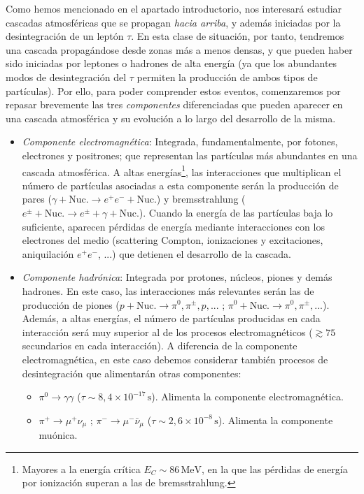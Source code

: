 \documentclass[12 pt, a4paper]{article} %
\numberwithin{equation}{section}
\numberwithin{figure}{section}
\numberwithin{table}{section}
\begin{document}
Como hemos mencionado en el apartado introductorio, nos interesará estudiar cascadas atmosféricas que se propagan \textit{hacia arriba}, y además iniciadas por la desintegración de un leptón $\tau$. En esta clase de situación, por tanto, tendremos una cascada propagándose desde zonas más a menos densas, y que pueden haber sido iniciadas por leptones o hadrones de alta energía (ya que los abundantes modos de desintegración del $\tau$ permiten la producción de ambos tipos de partículas). Por ello, para poder comprender estos eventos, comenzaremos por repasar brevemente las tres \textit{componentes} diferenciadas que pueden aparecer en una cascada atmosférica y su evolución a lo largo del desarrollo de la misma.
\begin{itemize}
	\item\textit{Componente electromagnética}: Integrada, fundamentalmente, por fotones, electrones y positrones; que representan las partículas más abundantes en una cascada atmosférica. A altas energías\footnote{ Mayores a la energía crítica $E_C\sim86\,\mathrm{MeV}$, en la que las pérdidas de energía por ionización superan a las de bremsstrahlung.}, las interacciones que multiplican el número de partículas asociadas a esta componente serán la producción de pares ($\gamma+\text{Nuc.}\rightarrow e^+e^-+\text{Nuc.}$) y bremsstrahlung ($e^\pm+\text{Nuc.}\rightarrow e^\pm+\gamma+\text{Nuc.}$). Cuando la energía de las partículas baja lo suficiente, aparecen pérdidas de energía mediante interacciones con los electrones del medio (scattering Compton, ionizaciones y excitaciones, aniquilación $e^+e^-$, ...) que detienen el desarrollo de la cascada.
	\item\textit{Componente hadrónica}: Integrada por protones, núcleos, piones y demás hadrones. En este caso, las interacciones más relevantes serán las de producción de piones ($p+\text{Nuc.}\rightarrow\pi^0,\pi^\pm,p,...$ ; $\pi^0+\text{Nuc.}\rightarrow \pi^0,\pi^\pm,...$). Además, a altas energías, el número de partículas producidas en cada interacción será muy superior al de los procesos electromagnéticos ($\gtrsim75$ secundarios en cada interacción). A diferencia de la componente electromagnética, en este caso debemos considerar también procesos de desintegración que alimentarán otras componentes:
	\begin{itemize}
		\item $\pi^0\rightarrow\gamma\gamma$ ($\tau\sim8,4\times10^{-17}\,\mathrm{s}$). Alimenta la componente electromagnética.
		\item  $\pi^+\rightarrow\mu^+\nu_\mu$ ; $\pi^-\rightarrow\mu^-\bar\nu_\mu$ ($\tau\sim2,6\times10^{-8}\,\mathrm{s}$). Alimenta la componente muónica.

\end{itemize}
\end{itemize}
\end{document}
